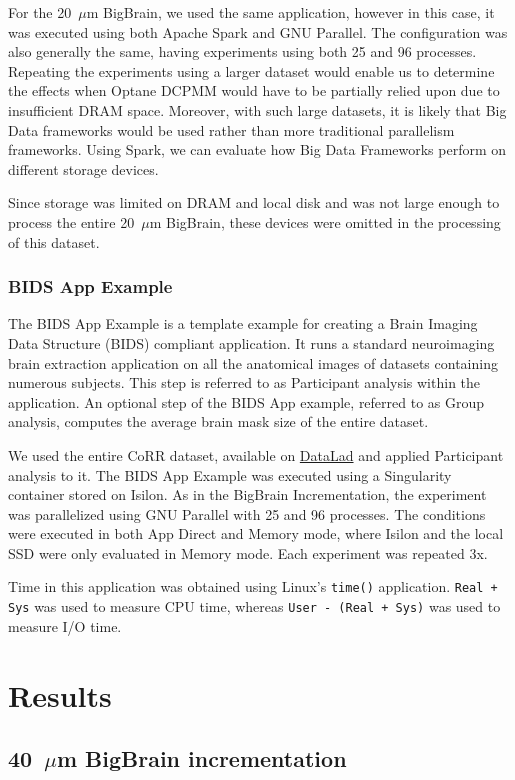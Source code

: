 \documentclass[conference]{IEEEtran}
\newcommand{\bigbrain}{BigBrain\xspace}
\begin{document}
For the 20~$\mu$m \bigbrain, we used the same application, however in this case, it was executed
using both Apache Spark and GNU Parallel. The configuration was also generally the same, having 
experiments using both 25 and 96 processes. Repeating the experiments using a larger dataset would enable
us to determine the effects when Optane DCPMM would have to be partially relied upon due to insufficient DRAM
space. Moreover, with such large datasets, it is likely that Big Data frameworks would be used rather than
more traditional parallelism frameworks. Using Spark, we can evaluate how Big Data Frameworks perform on
different storage devices.

Since storage was limited on DRAM and local disk and was not large enough to process the entire
20~$\mu$m \bigbrain, these devices were omitted in the processing of this dataset. 

\subsubsection{BIDS App Example}

The BIDS App Example is a template example for creating a Brain Imaging Data Structure (BIDS)
compliant application. It runs a standard neuroimaging brain extraction application 
on all the anatomical images of datasets containing numerous subjects. This step is 
referred to as Participant analysis within the application. An optional
step of the BIDS App example, referred to as Group analysis, computes the average brain
mask size of the entire dataset.

We used the entire CoRR dataset, available on \href{https://www.datalad.org/}{DataLad} and
applied Participant analysis to it. The BIDS App Example was executed using a Singularity container stored on
Isilon. As in the BigBrain Incrementation, the experiment was parallelized 
using GNU Parallel with 25 and 96 processes. The conditions were executed in both App Direct and Memory mode,
where Isilon and the local SSD were only evaluated in Memory mode. Each experiment was repeated 3x.

Time in this application was obtained using Linux's \texttt{time()} application.
\texttt{Real + Sys} was used to measure CPU time,
whereas \texttt{User - (Real + Sys)} was used to measure
I/O time.
\section{Results}

\subsection{40~$\mu$m \bigbrain incrementation}
\end{document}
